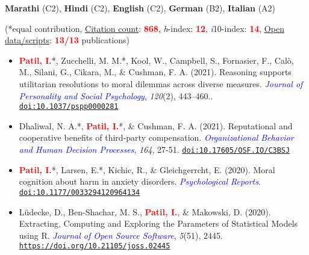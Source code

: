 \documentclass[10pt]{article}
\begin{document}
	\textbf{Marathi} (C2), \textbf{Hindi} (C2), \textbf{English} (C2), \textbf{German} (B2), \textbf{Italian} (A2)
	

	\begin{center}
	(*equal contribution, \href{https://scholar.google.it/citations?user=kSYuYTUAAAAJ&hl=en&oi=ao}{Citation count}: \textbf{\textcolor{red}{868}}, \textit{h}-index: \textbf{\textcolor{red}{12}}, \textit{i}10-index: \textbf{\textcolor{red}{14}}, \href{https://osf.io/hk5f3/}{Open data/scripts}: \textbf{\textcolor{red}{13/13}} publications)
	\end{center}
	
	\begin{itemize}
	
	\item \textbf{\textcolor{red}{Patil, I.}}*, Zucchelli, M. M.*, Kool, W., Campbell, S., Fornasier, F., Cal\`{o}, M., Silani, G., Cikara, M., \& Cushman, F. A. (2021). Reasoning supports utilitarian resolutions to moral dilemmas across diverse measures. \textit{\textcolor{blue}{Journal of Personality and Social Psychology}}, \textit{120}(2), 443–460.. \href{https://www.researchgate.net/publication/338496843_Reasoning_supports_utilitarian_resolutions_to_moral_dilemmas_across_diverse_measures}{\tt doi:10.1037/pspp0000281}
	
	\item Dhaliwal, N. A.*, \textbf{\textcolor{red}{Patil, I.}}*, \& Cushman, F. A. (2021). Reputational and cooperative benefits of third-party compensation. \textit{\textcolor{blue}{Organizational Behavior and Human Decision Processes}}, \textit{164}, 27-51. \href{https://www.researchgate.net/publication/349073655_Reputational_and_cooperative_benefits_of_third-party_compensation}{\tt doi:10.17605/OSF.IO/C3BSJ}
	
	\item  \textbf{\textcolor{red}{Patil, I.}}*, Larsen, E.*, Kichic, R., \& Gleichgerrcht, E. (2020). Moral cognition about harm in anxiety  disorders. \textit{\textcolor{blue}{Psychological Reports}}. \href{https://psyarxiv.com/g5p7v/}{\tt doi:10.1177/0033294120964134}
	
    \item Lüdecke, D., Ben-Shachar,  M. S., \textbf{\textcolor{red}{Patil, I.}}, \& Makowski, D. (2020). Extracting, Computing and Exploring the Parameters of Statistical Models using R. \textit{\textcolor{blue}{Journal of Open Source Software}}, \textit{5}(51), 2445. \href{https://joss.theoj.org/papers/10.21105/joss.02445}{\tt https://doi.org/10.21105/joss.02445}
	

\end{itemize}
\end{document}
